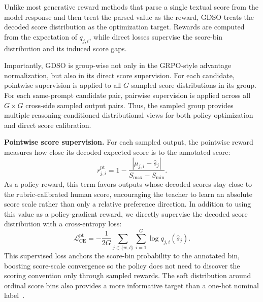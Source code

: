 \documentclass{llmxive}
\providecommand{\teaname}{GDSO\xspace}
\begin{document}
Unlike most generative reward methods that parse a single textual score from the model response and then treat the parsed value as the reward, \teaname treats the decoded score distribution as the optimization target. Rewards are computed from the expectation of $q_{j,i}$, while direct losses supervise the score-bin distribution and its induced score gaps.

Importantly, \teaname is group-wise not only in the GRPO-style advantage normalization, but also in its direct score supervision. For each candidate, pointwise supervision is applied to all $G$ sampled score distributions in its group. For each same-prompt candidate pair, pairwise supervision is applied across all $G \times G$ cross-side sampled output pairs. Thus, the sampled group provides multiple reasoning-conditioned distributional views for both policy optimization and direct score calibration.

\textbf{Pointwise score supervision.}
For each sampled output, the pointwise reward measures how close its decoded expected score is to the annotated score:
\begin{equation}
r^{\mathrm{pt}}_{j,i}
=
1 -
\frac{\left|\mu_{j,i}-\hat{s}_j\right|}{S_{\max}-S_{\min}}.
\label{eq:pointwise-reward}
\end{equation}
As a policy reward, this term favors outputs whose decoded scores stay close to the rubric-calibrated human score, encouraging the teacher to learn an absolute score scale rather than only a relative preference direction. In addition to using this value as a policy-gradient reward, we directly supervise the decoded score distribution with a cross-entropy loss:
\begin{equation}
\mathcal{L}^{\mathrm{pt}}_{\mathrm{CE}}
=
-\frac{1}{2G}
\sum_{j \in \{w,l\}}\sum_{i=1}^{G}
\log q_{j,i}(\hat{s}_j).
\label{eq:pointwise-ce}
\end{equation}
This supervised loss anchors the score-bin probability to the annotated bin, boosting score-scale convergence so the policy does not need to discover the scoring convention only through sampled rewards. The soft distribution around ordinal score bins also provides a more informative target than a one-hot nominal label~\cite{diaz2019soft,wen2023ordinal}.
\end{document}
